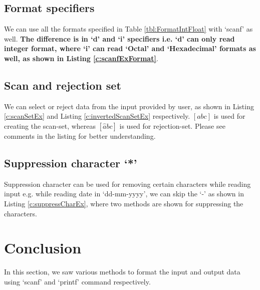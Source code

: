 \subsection{Format specifiers}
We can use all the formats specified in Table \ref{tbl:FormatIntFloat} with `scanf' as well. \textbf{The difference is in `d' and `i' specifiers i.e. `d' can only read integer format, where `i' can read `Octal' and `Hexadecimal' formats as well, as shown in Listing \ref{c:scanfExFormat}}.



\subsection{Scan and rejection set}
We can select or reject data from the input provided by user, as shown in Listing \ref{c:scanSetEx} and Listing \ref{c:invertedScanSetEx} respectively. $[ abc ]$ is used for creating the scan-set, whereas $[ \hat abc ]$ is used for rejection-set. Please see comments in the listing for better understanding. 




 
\subsection{Suppression character `*'}
Suppression character can be used for removing certain characters while reading input e.g. while reading date in `dd-mm-yyyy', we can skip the `-' as shown in Listing \ref{c:suppressCharEx}, where two methods are shown for suppressing the characters. 



\section{Conclusion}
In this section, we saw various methods to format the input and output data using `scanf' and `printf' command respectively. 